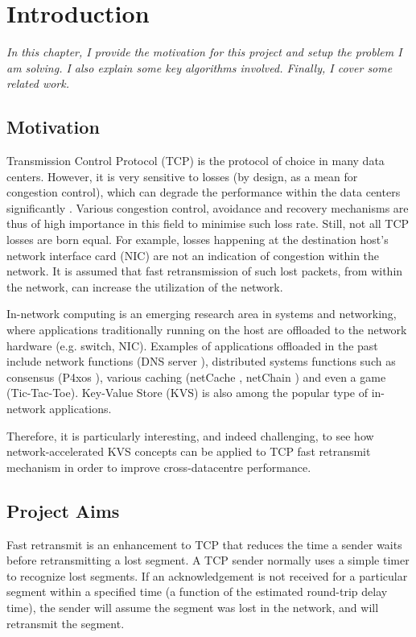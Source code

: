 \chapter{Introduction}
\textit{In this chapter, I provide the motivation for this project and setup the problem I am solving. I also explain some key algorithms involved. Finally, I cover some related work.}

\section{Motivation}
	
 Transmission Control Protocol (TCP) is the protocol of choice in many data centers. However, it is very sensitive to losses (by design, as a mean for congestion control), which can degrade the performance within the data centers significantly \cite{zilberman2017has}. Various congestion control, avoidance and recovery mechanisms are thus of high importance in this field to minimise such loss rate. Still, not all TCP losses are born equal. For example, losses happening at the destination host's network interface card (NIC) are not an indication of congestion within the network. It is assumed that fast retransmission of such lost packets, from within the network, can increase the utilization of the network.
 
 In-network computing is an emerging research area in systems and networking, where applications traditionally running on the host are offloaded to the network hardware (e.g. switch, NIC). Examples of applications offloaded in the past include network functions (DNS server \cite{dns}), distributed systems functions such as consensus (P4xos \cite{p4xos}), various caching (netCache \cite{netCache}, netChain \cite{netChain}) and even a game (Tic-Tac-Toe). Key-Value Store (KVS) is also among the popular type of in-network applications. 
 
 Therefore, it is particularly interesting, and indeed challenging, to see how network-accelerated KVS concepts can be applied to TCP fast retransmit mechanism in order to improve cross-datacentre performance.
 
\section{Project Aims}
Fast retransmit is an enhancement to TCP that reduces the time a sender waits before retransmitting a lost segment. A TCP sender normally uses a simple timer to recognize lost segments. If an acknowledgement is not received for a particular segment within a specified time (a function of the estimated round-trip delay time), the sender will assume the segment was lost in the network, and will retransmit the segment.

